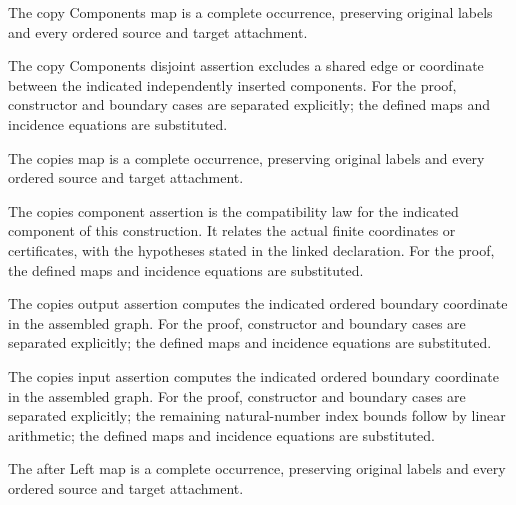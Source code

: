 The copy Components map is a complete occurrence, preserving original labels and every ordered source and target attachment.
\par{}

The copy Components disjoint assertion excludes a shared edge or coordinate between the indicated independently inserted components.
For the proof, constructor and boundary cases are separated explicitly; the defined maps and incidence equations are substituted.
\par{}

The copies map is a complete occurrence, preserving original labels and every ordered source and target attachment.
\par{}

The copies component assertion is the compatibility law for the indicated component of this construction. It relates the actual finite coordinates or certificates, with the hypotheses stated in the linked declaration.
For the proof, the defined maps and incidence equations are substituted.
\par{}

The copies output assertion computes the indicated ordered boundary coordinate in the assembled graph.
For the proof, constructor and boundary cases are separated explicitly; the defined maps and incidence equations are substituted.
\par{}

The copies input assertion computes the indicated ordered boundary coordinate in the assembled graph.
For the proof, constructor and boundary cases are separated explicitly; the remaining natural-number index bounds follow by linear arithmetic; the defined maps and incidence equations are substituted.
\par{}

The after Left map is a complete occurrence, preserving original labels and every ordered source and target attachment.
\par{}

